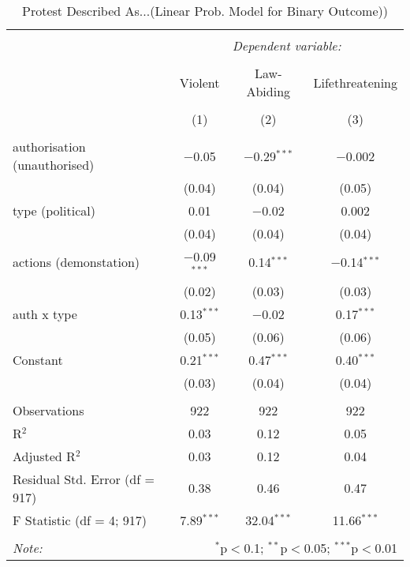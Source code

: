 
\begin{table}[!htbp] \centering 
  \caption{Protest Described As...(Linear Prob. Model for Binary Outcome))} 
  \label{} 
\begin{tabular}{@{\extracolsep{5pt}}lccc} 
\\[-1.8ex]\hline 
\hline \\[-1.8ex] 
 & \multicolumn{3}{c}{\textit{Dependent variable:}} \\ 
\cline{2-4} 
\\[-1.8ex] & Violent & Law-Abiding & Lifethreatening \\ 
\\[-1.8ex] & (1) & (2) & (3)\\ 
\hline \\[-1.8ex] 
 authorisation (unauthorised) & $-$0.05 & $-$0.29$^{***}$ & $-$0.002 \\ 
  & (0.04) & (0.04) & (0.05) \\ 
  type (political) & 0.01 & $-$0.02 & 0.002 \\ 
  & (0.04) & (0.04) & (0.04) \\ 
  actions (demonstation) & $-$0.09$^{***}$ & 0.14$^{***}$ & $-$0.14$^{***}$ \\ 
  & (0.02) & (0.03) & (0.03) \\ 
  auth x type & 0.13$^{***}$ & $-$0.02 & 0.17$^{***}$ \\ 
  & (0.05) & (0.06) & (0.06) \\ 
  Constant & 0.21$^{***}$ & 0.47$^{***}$ & 0.40$^{***}$ \\ 
  & (0.03) & (0.04) & (0.04) \\ 
 \hline \\[-1.8ex] 
Observations & 922 & 922 & 922 \\ 
R$^{2}$ & 0.03 & 0.12 & 0.05 \\ 
Adjusted R$^{2}$ & 0.03 & 0.12 & 0.04 \\ 
Residual Std. Error (df = 917) & 0.38 & 0.46 & 0.47 \\ 
F Statistic (df = 4; 917) & 7.89$^{***}$ & 32.04$^{***}$ & 11.66$^{***}$ \\ 
\hline 
\hline \\[-1.8ex] 
\textit{Note:}  & \multicolumn{3}{r}{$^{*}$p$<$0.1; $^{**}$p$<$0.05; $^{***}$p$<$0.01} \\ 
\end{tabular} 
\end{table} 
